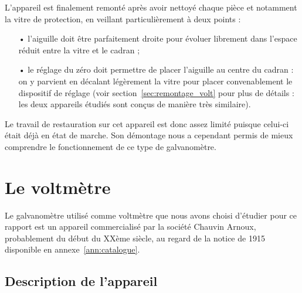 \documentclass[12pt,a4paper,fleqn]{article}
\begin{document}
L'appareil est finalement remonté après avoir nettoyé chaque pièce et notamment la vitre de protection, en veillant particulièrement à deux points :
\begin{itemize}
\item[•] l'aiguille doit être parfaitement droite pour évoluer librement dans l'espace réduit entre la vitre et le cadran ;
\item[•] le réglage du zéro doit permettre de placer l'aiguille au centre du cadran : on y parvient en décalant légèrement la vitre pour placer convenablement le dispositif de réglage (voir section~\ref{sec:remontage_volt} pour plus de détails : les deux appareils étudiés sont conçus de manière très similaire).
\end{itemize}
Le travail de restauration sur cet appareil est donc assez limité puisque celui-ci était déjà en état de marche.
Son démontage nous a cependant permis de mieux comprendre le fonctionnement de ce type de galvanomètre.





\section{Le voltmètre}

Le galvanomètre utilisé comme voltmètre que nous avons choisi d'étudier pour ce rapport est un appareil commercialisé par la société Chauvin Arnoux, probablement du début du XXème siècle, au regard de la notice de 1915 disponible en annexe~\ref{ann:catalogue}.

\subsection{Description de l'appareil}
\end{document}

